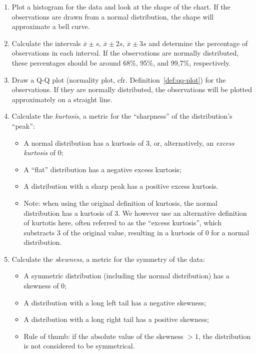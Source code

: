 \begin{enumerate}
  \item Plot a histogram for the data and look at the shape of the chart. If the observations are drawn from a normal distribution, the shape will approximate a bell curve.
  \item Calculate the intervals $\overline{x} \pm s$, $\overline{x} \pm 2s$, $\overline{x} \pm 3s$ and determine the percentage of observations in each interval. If the observations are normally distributed, these percentages should be around 68\%, 95\%, and 99,7\%, respectively.
  \item Draw a Q-Q plot (normality plot, cfr. Definition~\ref{def:qq-plot}) for the observations. If they are normally distributed, the observations will be plotted approximately on a straight line.
  \item Calculate the \emph{kurtosis}, a metric for the ``sharpness'' of the distribution's ``peak'':
    \begin{itemize}
      \item A normal distribution has a kurtosis of 3, or, alternatively, an \emph{excess kurtosis} of 0;
      \item A ``flat'' distribution has a negative excess kurtosis;
      \item A distribution with a sharp peak has a positive excess kurtosis.
      \item Note: when using the original definition of kurtosis, the normal distribution has a kurtosis of 3. We however use an alternative definition of kurtotis here, often referred to as the ``excess kurtosis'', which substracts 3 of the original value, resulting in a kurtosis of 0 for a normal distribution.
    \end{itemize}
  \item Calculate the \emph{skewness}, a metric for the symmetry of the data:
    \begin{itemize}
      \item A symmetric distribution (including the normal distribution) has a skewness of 0;
      \item A distribution with a long left tail has a negative skewness;
      \item A distribution with a long right tail has a positive skewness;
      \item Rule of thumb: if the absolute value of the skewness $>1$, the distribution is not considered to be symmetrical.
    \end{itemize}
\end{enumerate}

